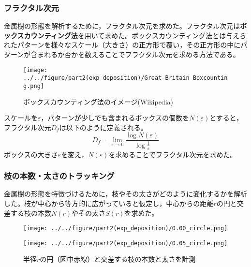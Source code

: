 \documentclass[autodetect-engine,dvi=dvipdfmx,a4paper,ja=standard,oneside,openany,11pt,draft]{bxjsarticle}
\begin{document}
\subsubsection{フラクタル次元}
金属樹の形態を解析するために，フラクタル次元を求めた。フラクタル次元は\textbf{ボックスカウンティング法}を用いて求めた。ボックスカウンティング法とは与えられたパターンを様々なスケール（大きさ）の正方形で覆い，その正方形の中にパターンが含まれるか否かを数えることでフラクタル次元を求める方法である。
\begin{figure}[H]
  \centering
  \texttt{[image: ../../figure/part2(exp\_deposition)/Great\_Britain\_Boxcounting.png]}
  \caption{ボックスカウンティング法のイメージ(Wikipedia)}
  \label{fig:box_counting}
\end{figure}
スケールを$\varepsilon$，パターンが少しでも含まれるボックスの個数を$N(\varepsilon)$とすると，フラクタル次元$D_f$は以下のように定義される。
\begin{equation}
  D_f = \lim_{\varepsilon \to 0} \frac{\log N(\varepsilon)}{\log \frac{1}{\varepsilon}}
\end{equation}
ボックスの大きさ$\varepsilon$を変え，$N(\varepsilon)$を求めることでフラクタル次元を求めた。
\subsubsection{枝の本数・太さのトラッキング}
金属樹の形態を特徴づけるために，枝やその太さがどのように変化するかを解析した。枝が中心から等方的に広がっていると仮定し，中心からの距離$r$の円と交差する枝の本数$N(r)$やその太さ$S(r)$を求めた。
\begin{figure}[H]
  \begin{minipage}
    {0.5\textwidth}
    \centering
    \texttt{[image: ../../figure/part2(exp\_deposition)/0.00\_circle.png]}
    \label{fig:0.00_circle}
  \end{minipage}
  \begin{minipage}
    {0.5\textwidth}
    \centering
    \texttt{[image: ../../figure/part2(exp\_deposition)/0.05\_circle.png]}
    \label{fig:0.05_circle}
  \end{minipage}
  \caption{半径$r$の円（図中赤線）と交差する枝の本数と太さを計測}
\end{figure}
\end{document}
